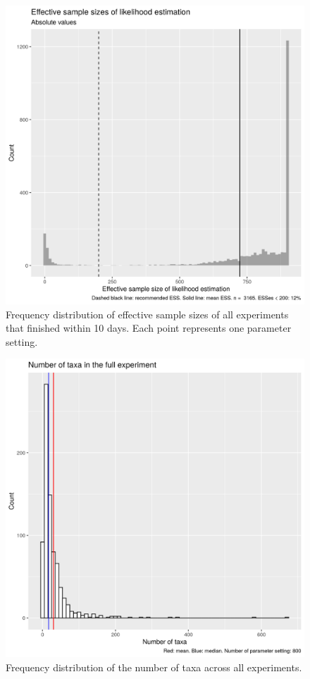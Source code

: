\begin{figure}[!htbp]
  \includegraphics[width=1.0\textwidth]{20200204_fig_esses.png}
  \caption{
    Frequency distribution of effective sample sizes of all experiments that
    finished within 10 days. 
    Each point represents one parameter setting.
  }
  \label{fig:esses}
\end{figure}

\begin{figure}[!htbp]
  \includegraphics[width=1.0\textwidth]{20200204_fig_n_taxa.png}
  \caption{
    Frequency distribution of the number of taxa across all experiments.
  }
  \label{fig:n_taxa}
\end{figure}

